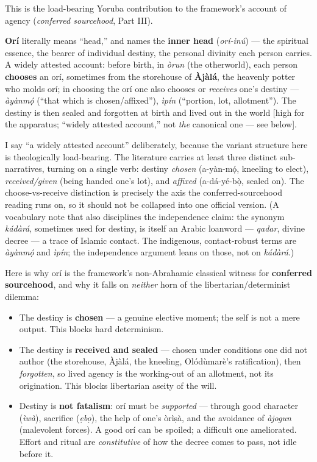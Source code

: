 \documentclass[11pt]{article}
\begin{document}
This is the load-bearing Yoruba contribution to the framework's account of agency (\emph{conferred sourcehood}, Part III).

\textbf{Orí} literally means ``head,'' and names the \textbf{inner head} (\emph{orí-inú}) — the spiritual essence, the bearer of individual destiny, the personal divinity each person carries. A widely attested account: before birth, in \emph{òrun} (the otherworld), each person \textbf{chooses} an orí, sometimes from the storehouse of \textbf{Àjàlá}, the heavenly potter who molds orí; in choosing the orí one also chooses or \emph{receives} one's destiny — \emph{àyànmọ́} (``that which is chosen/\allowbreak{}affixed''), \emph{ìpín} (``portion, lot, allotment''). The destiny is then sealed and forgotten at birth and lived out in the world [high for the apparatus; ``widely attested account,'' not \emph{the} canonical one — see below].

I say ``a widely attested account'' deliberately, because the variant structure here is theologically load-bearing. The literature carries at least three distinct sub-narratives, turning on a single verb: destiny \emph{chosen} (a-yàn-mọ́, kneeling to elect), \emph{received/\allowbreak{}given} (being handed one's lot), and \emph{affixed} (a-dá-yé-bọ̀, sealed on). The choose-vs-receive distinction is precisely the axis the conferred-sourcehood reading runs on, so it should not be collapsed into one official version. (A vocabulary note that also disciplines the independence claim: the synonym \emph{kádàrá}, sometimes used for destiny, is itself an Arabic loanword — \emph{qadar}, divine decree — a trace of Islamic contact. The indigenous, contact-robust terms are \emph{àyànmọ́} and \emph{ìpín}; the independence argument leans on those, not on \emph{kádàrá}.)

Here is why orí is the framework's non-Abrahamic classical witness for \textbf{conferred sourcehood}, and why it falls on \emph{neither} horn of the libertarian/\allowbreak{}determinist dilemma:

\begin{itemize}
\item The destiny is \textbf{chosen} — a genuine elective moment; the self is not a mere output. This blocks hard determinism.
\item The destiny is \textbf{received and sealed} — chosen under conditions one did not author (the storehouse, Àjàlá, the kneeling, Olódùmarè's ratification), then \emph{forgotten}, so lived agency is the working-out of an allotment, not its origination. This blocks libertarian aseity of the will.
\item Destiny is \textbf{not fatalism}: orí must be \emph{supported} — through good character (\emph{ìwà}), sacrifice (\emph{ẹbọ}), the help of one's òrìṣà, and the avoidance of \emph{àjogun} (malevolent forces). A good orí can be spoiled; a difficult one ameliorated. Effort and ritual are \emph{constitutive} of how the decree comes to pass, not idle before it.
\end{itemize}
\end{document}
